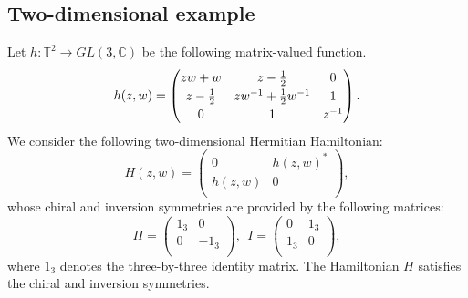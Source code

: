 \documentclass{amsart}
\theoremstyle{plain}
\theoremstyle{definition}
\theoremstyle{remark}
\newcommand{\C}{\mathbb{C}}
\newcommand{\T}{\mathbb{T}}
\begin{document}
\subsection{Two-dimensional example}
\label{Sect5.1}
Let $h \colon \T^2 \to GL(3,\C)$ be the following matrix-valued function.
\begin{equation*}
	h(z,w) =
{\renewcommand{\arraystretch}{1.2}
\begin{pmatrix}
zw + w & z - \frac{1}{2} & 0 \\
z - \frac{1}{2} & zw^{-1}+ \frac{1}{2}w^{-1} & 1 \\
0 & 1 & z^{-1} \\
\end{pmatrix}.}
\end{equation*}
We consider the following two-dimensional Hermitian Hamiltonian:
\begin{equation*}
	H(z,w)=
\begin{pmatrix}
0 & h(z,w)^* \\
h(z,w) & 0 \\
\end{pmatrix},
\end{equation*}
whose chiral and inversion symmetries are provided by the following matrices:
\begin{equation*}
\Pi =
\begin{pmatrix}
1_3 & 0 \\
0 & -1_3 \\
\end{pmatrix},
\ \
I =
\begin{pmatrix}
0 & 1_3 \\
1_3 & 0 \\
\end{pmatrix},
\end{equation*}
where $1_3$ denotes the three-by-three identity matrix.
The Hamiltonian $H$ satisfies the chiral and inversion symmetries.
\end{document}
